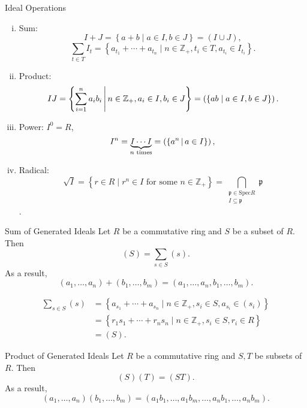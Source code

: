 \begin{definition}{Ideal Operations}{}
    \begin{enumerate}[(i)]
        \item Sum: $$I+J=\left\{a+b\mid a\in I,b\in J\right\}=\left(I\cup J\right),$$
        $$
        \sum_{t \in T} I_t=\left\{a_{t_1}+ \cdots +a_{t_n}\mid n\in\mathbb{Z}_{+},t_i\in T,a_{t_i}\in I_{t_i}\right\}.
        $$
        \item Product: $$IJ=\left\{\sum_{i=1}^n a_ib_i\,\middle\vert\, n\in\mathbb{Z}_{+},a_i\in I,b_i\in J\right\}=\left(\{ab\mid a\in I,b\in J\}\right).$$
        \item Power: $I^0=R$,
        \[
            I^n=\underbrace{I\cdots I}_{n\text{ times}}=\left(\{a^n\,\middle\vert\, a\in I\}\right), 
            \]
        \item Radical: \[
            \sqrt{I} = \left\{ r \in R \mid r^n \in I \text{ for some } n \in \mathbb{Z}_{+} \right\} = \bigcap_{\substack{\mathfrak{p} \in \mathrm{Spec} R \\ I \subseteq \mathfrak{p}}} \mathfrak{p}
            \].
    \end{enumerate}
\end{definition}

\begin{proposition}{Sum of Generated Ideals}{}
    Let $R$ be a commutative ring and $S$ be a subset of $R$. Then 
    $$(S)=\sum_{s\in S}(s).$$ As a result,
    \[
    (a_1,\dots,a_n)+(b_1,\dots,b_m)=(a_1,\dots,a_n,b_1,\dots,b_m).
    \]
\end{proposition}

\begin{prf}
    \begin{align*}
        \sum_{s \in S} (s)&=\left\{a_{s_1}+ \cdots +a_{s_n}\mid n\in\mathbb{Z}_{+},s_i\in S,a_{s_i}\in (s_i)\right\}\\
        &=\left\{r_1s_{1}+ \cdots +r_ns_{n}\mid n\in\mathbb{Z}_{+},s_i\in S,r_i\in R\right\}\\
        &=(S).
    \end{align*}
\end{prf}

\begin{proposition}{Product of Generated Ideals}{}
    Let $R$ be a commutative ring and $S,T$ be subsets of $R$. Then 
    \[
        (S)(T)=(ST).
    \]
    As  a result,
    \[
        (a_1,\dots,a_n)(b_1,\dots,b_m)=(a_1b_1,\dots,a_1b_m,\dots,a_nb_1,\dots,a_nb_m).
    \]
\end{proposition}


